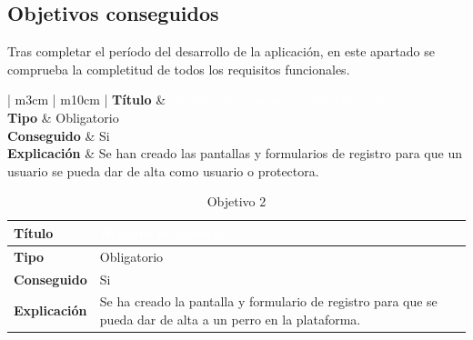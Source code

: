 \documentclass[a4paper, 12pt]{article}
\begin{document}
\subsection{Objetivos conseguidos}

Tras completar el período del desarrollo de la aplicación, en este apartado se comprueba la completitud de todos los requisitos funcionales.

\begin{table}[H]
	\captionsetup{width=0.95\linewidth}%
   	\captionsetup{singlelinecheck=false}%
	\captionsetup{font=bf}
	\caption{Objetivo 1}
	\begin{tabular}{ | m{3cm} | m{10cm} | }
		\hline {}\textbf{Título} &  \textcolor{white}{\textit{Registro de usuarios con diferentes roles}}  \\ \hline
		\textbf{Tipo} & Obligatorio \\ \hline
		\textbf{Conseguido} & Si \\ \hline
		\textbf{Explicación} & Se han creado las pantallas y formularios de registro para que un usuario se pueda dar de alta como usuario o protectora.  \\ \hline
	\end{tabular}
\end{table} 

\begin{table}[H]
	\captionsetup{width=0.95\linewidth}%
   	\captionsetup{singlelinecheck=false}%
	\captionsetup{font=bf}
	\caption{Objetivo 2}
	\begin{tabular}{ | m{3cm} | m{10cm} | }
		\hline \cellcolor{lightgray}\textbf{Título} & \cellcolor{gray} \textcolor{white}{\textit{Registro de caninos}}  \\ \hline
		\cellcolor{lightgray}\textbf{Tipo} & Obligatorio \\ \hline
		\cellcolor{lightgray}\textbf{Conseguido} & Si \\ \hline
		\cellcolor{lightgray}\textbf{Explicación} & Se ha creado la pantalla y formulario de registro para que se pueda dar de alta a un perro en la plataforma.  \\ \hline
	\end{tabular}
\end{table} 
\end{document}
